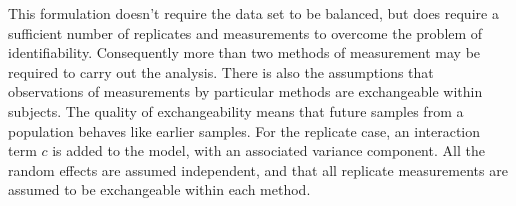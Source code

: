 \documentclass[12pt, a4paper]{report}
\theoremstyle{plain}
\theoremstyle{definition}
\theoremstyle{remark}
\begin{document}
This formulation doesn't require the data set to be balanced, but does require a sufficient number of replicates and measurements to overcome the problem of identifiability. Consequently more than two methods of measurement may
be required to carry out the analysis. There is also the assumptions that observations of measurements by particular methods are exchangeable within subjects. The quality of exchangeability means that future samples from a population behaves like earlier samples. For the replicate case, an interaction term $c$ is added to the model, with an associated variance component. All the random effects are assumed independent, and that all replicate measurements are assumed to be exchangeable within each method. 
	
	
	
	
	
	
%	
	
\end{document}
